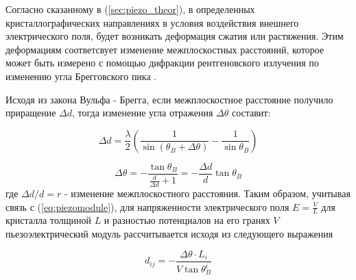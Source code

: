 Согласно сказанному в (\ref{sec:piezo_theor}), в определенных кристаллографических направлениях в
условия воздействия внешнего электрического поля, будет возникать деформация
сжатия или растяжения. Этим деформациям соответсвует изменение межплоскостных
 расстояний, которое может быть измерено с помощью дифракции рентгеновского
 излучения по изменению угла Брегговского пика \cite{marchenkov2014}.

Исходя из закона Вульфа - Брегга, если межплоскостное расстояние получило приращение
$\Delta d$, тогда изменение угла отражения $\Delta \theta$ составит:

$$ \Delta d = \frac{\lambda}{2}\left( \frac{1}{\sin(\theta_B + \Delta \theta) } - \frac{1}{\sin \theta_B } \right) $$

\begin{equation}
   \Delta \theta =-  \frac{\tan \theta_B}{\frac{d}{\Delta d}+1}  = -  \frac{\Delta d }{d}  \tan \theta_B
\end{equation}
где $\Delta d/d = r$ - изменение межплоскостного расстояния. Таким образом, учитывая связь с
(\ref{eq:piezomodule}), для напряженности электрического поля $E = \frac{V}{L}$ для
 кристалла толщиной $L$ и разностью потенциалов на его гранях $V$ пьезоэлектрический модуль
 рассчитывается исходя из следующего выражения

 \begin{equation}
    d_{ij} = -\frac{\Delta \theta \cdot L_i}{V \tan \theta_B^i}
 \end{equation}
